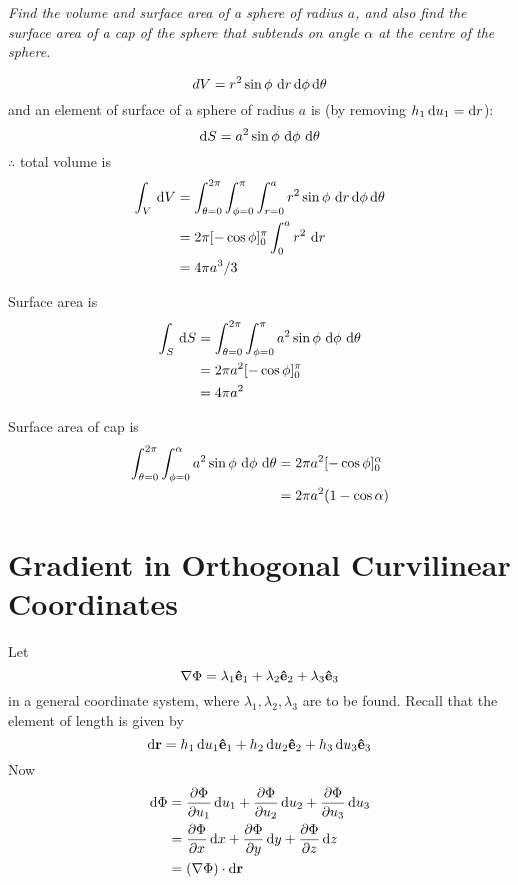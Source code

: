 \begin{exa}
\emph{Find the volume and surface area of a sphere of 
radius $a$, and also find the surface area of a cap of the sphere that subtends on angle $\alpha$ at the centre of the sphere.}

\[
  d V = r^2 \sin\phi\,\d r \d \phi \d \theta 
\]
and an element of surface of a sphere of radius $a$ is (by removing $h_1\d u_1 = \d r$):
\[
  \d S = a^2 \sin \phi \,\d \phi\,\d \theta 
\]
$\therefore$ total volume is 
\begin{align*}
  \int_V \,\d V 
  &= \int_{\theta=0}^{2\pi}\int_{\phi =0}^\pi \int_{r=0}^a r^2\sin\phi\, \d r \d \phi \d \theta \\
  &= 2\pi[-\cos\phi]_0^\pi \int_0^a r^2\,\d r\\
  &= 4\pi a^3/3\;
\end{align*}

Surface area is 
\begin{align*}
  \int_S \,\d S 
  &= \int_{\theta=0}^{2\pi} \int_{\phi =0}^\pi a^2\sin\phi \,\d\phi\,\d\theta\\
  &= 2\pi a^2[-\cos\phi]_0^\pi\\
  &= 4\pi a^2 \; 
\end{align*}

Surface area of cap is
\begin{align*}
  \int_{\theta=0}^{2\pi}\int_{\phi=0}^\alpha 
  a^2\sin\phi \,\d\phi\,\d \theta
  &= 2\pi a^2[-\cos\phi]_0^\alpha\\
  &= 2\pi a^2(1-\cos\alpha)
\end{align*}
\end{exa}


\section{Gradient in Orthogonal Curvilinear Coordinates}
Let 
\[
  \nabla \Phi = \lambda_1\mathbf{\hat e}_1 + \lambda_2\mathbf{\hat e}_2 + \lambda_3\mathbf{\hat e}_3
\]
in a general coordinate system, where $\lambda_1,\lambda_2,\lambda_3$ are to be found. 
Recall that the element of length is given by 
\[
  \d \mathbf r = h_1\d u_1\versor e_1 + h_2\d u_2\versor e_2 + h_3\d u_3\versor e_3
\]
Now 
\begin{align*}
  \d \Phi &= \dfrac{\partial \Phi}{\partial u_1}\d u_1 + \dfrac{\partial \Phi}{\partial u_2}\d u_2 + \dfrac{\partial \Phi}{\partial u_3}\d u_3\\
  &= \dfrac{\partial \Phi}{\partial x}\d x + \dfrac{\partial \Phi}{\partial  y}\d y + \dfrac{\partial \Phi}{\partial z}\d z\\
  &= (\nabla \Phi)\cdot \d \mathbf r 
\end{align*}

